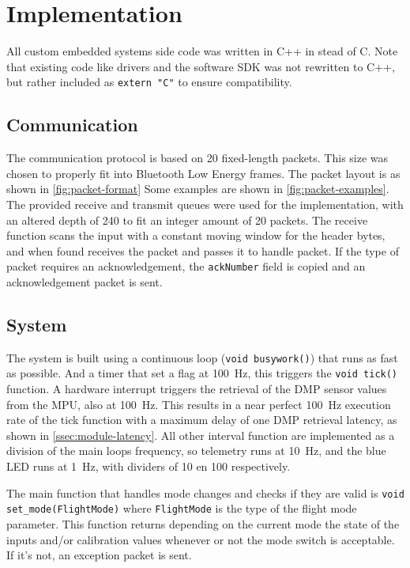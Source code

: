 \documentclass[final]{article}
\begin{document}
\section{Implementation}
\label{sec:implementation}

All custom embedded systems side code was written in C++ in stead of C.
Note that existing code like drivers and the software SDK was not rewritten to C++, but rather included as \texttt{extern "C"} to ensure compatibility.

\subsection{Communication}
The communication protocol is based on \SI{20}{\byte} fixed-length packets.
This size was chosen to properly fit into Bluetooth Low Energy frames.
The packet layout is as shown in \cref{fig:packet-format}
Some examples are shown in \cref{fig:packet-examples}. %
The provided receive and transmit queues were used for the implementation, with an altered depth of \SI{240}{\byte} to fit an integer amount of \SI{20}{\byte} packets.
The receive function scans the input with a constant moving window for the header bytes, and when found receives the packet and passes it to handle packet.
If the type of packet requires an acknowledgement, the \texttt{ackNumber} field is copied and an acknowledgement packet is sent.

\subsection{System}
The system is built using a continuous loop (\texttt{void busywork()}) that runs as fast as possible.
And a timer that set a flag at \SI{100}{\hertz}, this triggers the \texttt{void tick()} function.
A hardware interrupt triggers the retrieval of the DMP sensor values from the MPU, also at \SI{100}{\hertz}.
This results in a near perfect \SI{100}{\hertz} execution rate of the tick function with a maximum delay of one DMP retrieval latency, as shown in \cref{ssec:module-latency}.
All other interval function are implemented as a division of the main loops frequency, so telemetry runs at \SI{10}{\hertz}, and the blue LED runs at \SI{1}{\hertz}, with dividers of 10 en 100 respectively.

The main function that handles mode changes and checks if they are valid is \texttt{void set\_mode(FlightMode)} where \texttt{FlightMode} is the type of the flight mode parameter.
This function returns depending on the current mode the state of the inputs and/or calibration values whenever or not the mode switch is acceptable.
If it's not, an exception packet is sent.
\end{document}
